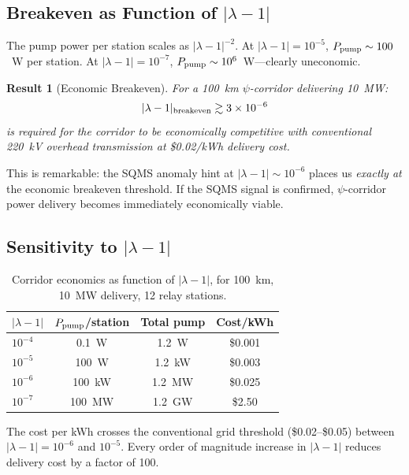 \documentclass[aps,prd,twocolumn,superscriptaddress]{revtex4-2}
\newtheorem{result}{Result}
\begin{document}
\subsection{Breakeven as Function of $|\lambda-1|$}

The pump power per station scales as $|\lambda-1|^{-2}$.  At
$|\lambda-1| = 10^{-5}$, $P_{\rm pump} \sim 100$~W per station.
At $|\lambda-1| = 10^{-7}$, $P_{\rm pump} \sim 10^6$~W---clearly
uneconomic.

\begin{result}[Economic Breakeven]
For a 100~km $\psi$-corridor delivering 10~MW:
\begin{equation}
|\lambda-1|_{\rm breakeven} \gtrsim 3\times 10^{-6}
\end{equation}
is required for the corridor to be economically competitive with
conventional 220~kV overhead transmission at \$0.02/kWh delivery cost.
\end{result}

This is remarkable: the SQMS anomaly hint at $|\lambda-1| \sim 10^{-6}$
places us \emph{exactly at} the economic breakeven threshold.  If the
SQMS signal is confirmed, $\psi$-corridor power delivery becomes
immediately economically viable.

\subsection{Sensitivity to $|\lambda-1|$}

\begin{table}[h]
\caption{Corridor economics as function of $|\lambda-1|$, for 100~km,
10~MW delivery, 12 relay stations.}
\label{tab:economics}
\begin{ruledtabular}
\begin{tabular}{lccc}
$|\lambda-1|$ & $P_{\rm pump}$/station & Total pump & Cost/kWh \\
\hline
$10^{-4}$ & 0.1~W & 1.2~W & \$0.001 \\
$10^{-5}$ & 100~W & 1.2~kW & \$0.003 \\
$10^{-6}$ & 100~kW & 1.2~MW & \$0.025 \\
$10^{-7}$ & 100~MW & 1.2~GW & \$2.50 \\
\end{tabular}
\end{ruledtabular}
\end{table}

The cost per kWh crosses the conventional grid threshold
(\$0.02--\$0.05) between $|\lambda-1| = 10^{-6}$ and $10^{-5}$.
Every order of magnitude increase in $|\lambda-1|$ reduces delivery
cost by a factor of 100.
\end{document}
